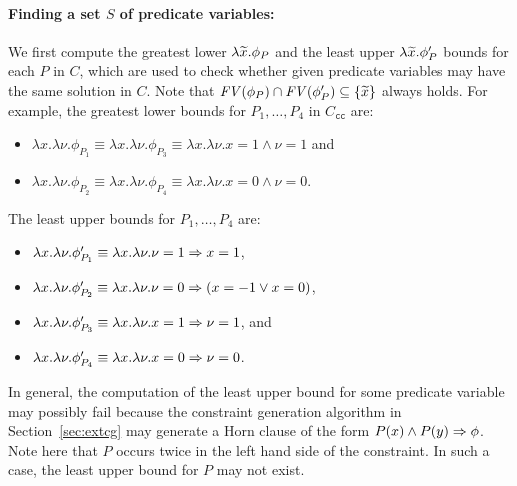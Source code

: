 \paragraph{Finding a set \(S\) of predicate variables:}
We first compute the greatest lower \(\lambda \widetilde{x}.\phi_P\) and the
least upper \(\lambda \widetilde{x}.\phi_P'\) bounds for each \(P\) in \(C\),
which are used to check whether given predicate variables may have the
same solution in \(C\).  Note that \(\mathit{FV}({\phi_P}) \cap \mathit{FV}({\phi_P'})
\subseteq \{{\widetilde{x}}\}\) always holds.
%
For example, the greatest lower bounds for \(P_1,\dots,P_4\) in
\(C_{\texttt{cc}}\) are:
\begin{itemize}
\item \(\lambda x.\lambda \nu.\phi_{P_1} \equiv \lambda x.\lambda \nu.\phi_{P_3} \equiv \lambda x.\lambda \nu.x=1 \land \nu=1\) and
\item \(\lambda x.\lambda \nu.\phi_{P_2} \equiv \lambda x.\lambda \nu.\phi_{P_4} \equiv \lambda x.\lambda \nu.x=0 \land \nu=0\).
\end{itemize}
The least upper bounds for \(P_1,\dots,P_4\) are:
\begin{itemize}
\item \(\lambda x.\lambda \nu.\phi_{P_1}'\equiv \lambda x.\lambda \nu.\nu=1 \Rightarrow x=1\),
\item \(\lambda x.\lambda \nu.\phi_{P_2}'\equiv \lambda x.\lambda \nu.\nu=0 \Rightarrow (x=-1 \lor x=0)\),
\item \(\lambda x.\lambda \nu.\phi_{P_3}'\equiv \lambda x.\lambda \nu.x=1 \Rightarrow \nu=1\), and
\item \(\lambda x.\lambda \nu.\phi_{P_4}'\equiv \lambda x.\lambda \nu.x=0 \Rightarrow \nu=0\).
\end{itemize}

In general, the computation of the least upper bound for some predicate
variable may possibly fail because the constraint generation algorithm
in Section~\ref{sec:extcg} may generate a Horn clause of the form
\(P(x)\land P(y) \Rightarrow \phi\).  Note here that \(P\) occurs twice in
the left hand side of the constraint.  In such a case, the least upper
bound for \(P\) may not exist.

